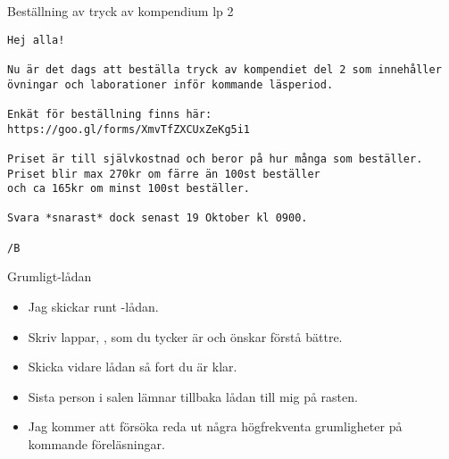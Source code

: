 \begin{Slide}{Beställning av tryck av kompendium lp 2}\SlideFontTiny
{}
\begin{verbatim}
Hej alla!

Nu är det dags att beställa tryck av kompendiet del 2 som innehåller
övningar och laborationer inför kommande läsperiod.

Enkät för beställning finns här:
https://goo.gl/forms/XmvTfZXCUxZeKg5i1

Priset är till självkostnad och beror på hur många som beställer.
Priset blir max 270kr om färre än 100st beställer
och ca 165kr om minst 100st beställer.

Svara *snarast* dock senast 19 Oktober kl 0900.

/B
\end{verbatim}
\end{Slide}


\begin{Slide}{Grumligt-lådan}
\begin{itemize}
\item Jag skickar runt -lådan.
\item Skriv lappar, , som du tycker är  och  önskar förstå bättre.
\item Skicka vidare lådan så fort du är klar.
\item Sista person i salen lämnar tillbaka lådan till mig på rasten.
\item Jag kommer att försöka reda ut några högfrekventa grumligheter på kommande föreläsningar.
\end{itemize}
\end{Slide}
